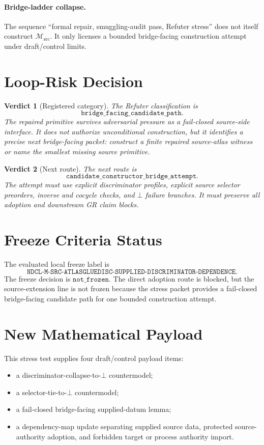 \documentclass[11pt]{article}
\newcommand{\Msrc}{\mathcal{M}_{\mathrm{src}}}
\newtheorem{verdict}{Verdict}
\begin{document}
\paragraph{Bridge-ladder collapse.}
The sequence ``formal repair, smuggling-audit pass, Refuter stress'' does not
itself construct \(\Msrc\). It only licenses a bounded bridge-facing
construction attempt under draft/control limits.

\section{Loop-Risk Decision}

\begin{verdict}[Registered category]
The Refuter classification is
\[
  \texttt{bridge\_facing\_candidate\_path}.
\]
The repaired primitive survives adversarial pressure as a fail-closed
source-side interface. It does not authorize unconditional construction, but
it identifies a precise next bridge-facing packet: construct a finite repaired
source-atlas witness or name the smallest missing source primitive.
\end{verdict}

\begin{verdict}[Next route]
The next route is
\[
  \texttt{candidate\_constructor\_bridge\_attempt}.
\]
The attempt must use explicit discriminator profiles, explicit source
selector preorders, inverse and cocycle checks, and \(\bot\) failure branches.
It must preserve all adoption and downstream GR claim blocks.
\end{verdict}

\section{Freeze Criteria Status}

The evaluated local freeze label is
\[
\texttt{NDCL-M-SRC-ATLASGLUEDISC-SUPPLIED-DISCRIMINATOR-DEPENDENCE}.
\]
The freeze decision is \(\texttt{not\_frozen}\). The direct adoption route is
blocked, but the source-extension line is not frozen because the stress
packet provides a fail-closed bridge-facing candidate path for one bounded
construction attempt.

\section{New Mathematical Payload}

This stress test supplies four draft/control payload items:
\begin{itemize}
  \item a discriminator-collapse-to-\(\bot\) countermodel;
  \item a selector-tie-to-\(\bot\) countermodel;
  \item a fail-closed bridge-facing supplied-datum lemma;
  \item a dependency-map update separating supplied source data, protected
  source-authority adoption, and forbidden target or process authority import.
\end{itemize}
\end{document}
